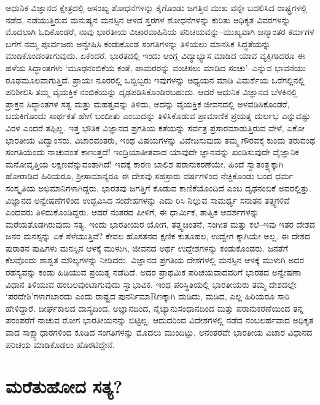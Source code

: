 ಆಧುನಿಕ ವಿಜ್ಞಾನದ ಕ್ಷೇತ್ರದಲ್ಲಿ ಅಸಂಖ್ಯ ಶೋಧನೆಗಳನ್ನು ಕೈಗೊಂಡು ಜಗತ್ತಿನ ಮುಖ ವನ್ನೇ ಬದಲಿಸಿದ ರಾಷ್ಟ್ರಗಳಲ್ಲಿ ನಡೆದ, ನಡೆಯುತ್ತಿರುವ ಮನುಷ್ಯನ ಮನಸ್ಸಿನ ಆಳದ ಸ್ತರಗಳ ಶೋಧನೆಗಳನ್ನು ಕುರಿತು ಅಧಿಕೃತ ವಿವರಗಳನ್ನು ಮೊದಲಾಗಿ ಓದಿಕೊಂಡರೆ, ನಾವು ಭಾರತೀಯ ವಿಚಾರವಾಹಿನಿಯ ಪರಿಚಯವನ್ನು–ಮುಖ್ಯವಾಗಿ ಜನ್ಮಾಂತರ ಕರ್ಮಗಳ ಬಗೆಗೆ ನಮ್ಮ ಪೂರ್ವಜರು ಅನ್ವೇಷಿಸಿ ಕಂಡುಕೊಂಡ ಸಂಗತಿಗಳನ್ನು ತಿಳಿಯಲು ಮಾನಸಿಕ ಸಿದ್ಧತೆಯನ್ನು ಮಾಡಿಕೊಂಡಂತಾಗುವುದು. ಏಕೆಂದರೆ, ಭಾರತದಲ್ಲಿ ಇಂದು ಆಂಗ್ಲ ವಿದ್ಯಾಭ್ಯಾಸ ಮಾಡಿದ ಯಾವ ವ್ಯಕ್ತಿಗಾದರೂ ಈ ಹಳೆಯ ಸಿದ್ಧಾಂತಗಳು ‘ಮೂಢನಂಬಿಕೆಯ ಕಂತೆ, ಪಾಮರರನ್ನು ವಂಚಿಸಲು ಮಾಡಿದ ಸಂಚು’–ಎನ್ನುವ ಭಾವನೆಯು ರೂಢಮೂಲವಾಗುತ್ತಿದೆ. ಪ್ರಾಯಃ ನೂರರಲ್ಲಿ ಒಬ್ಬಿಬ್ಬರು ಇವುಗಳನ್ನು ಅಧ್ಯಯನ ಮಾಡಿ ವಿಮರ್ಶೆಯ ಒರೆಗಲ್ಲಿನಲ್ಲಿ ಪರಿಶೀಲಿಸಿ ತಮ್ಮ ವೈಯಕ್ತಿಕ ನಂಬಿಕೆಯನ್ನು ದೃಢಪಡಿಸಿಕೊಂಡಿರಬಹುದು. ಆದರೆ ಆಧುನಿಕ ವಿಜ್ಞಾನದ ಬೆಳಕಿನಲ್ಲಿ ಪ್ರಾಕ್ತನ ಸಿದ್ಧಾಂತಗಳ ಸತ್ವ ಮತ್ತು ಮಹತ್ವವನ್ನು ತಿಳಿದು, ಅದನ್ನು ವೈಯಕ್ತಿಕ ಜೀವನದಲ್ಲಿ ಅಳವಡಿಸಿಕೊಂಡರೆ, ಬದುಕಿಗೊಂದು ಸಾರ್ಥಕತೆ ಹೇಗೆ ಬಂದೀತು ಎಂಬುದನ್ನು ತಿಳಿಸಿಕೊಡುವ ಪ್ರಾಮಾಣಿಕ ಪ್ರಯತ್ನ ದುರ್ಲಭ ಎನ್ನುವಷ್ಟು ವಿರಳ ಎಂದರೆ ತಪ್ಪಿಲ್ಲ. ಇತ್ತ ಭೌತಿಕ ವಿಜ್ಞಾನದ ಪ್ರಗತಿಯ ಕತೆಯನ್ನು ಸರ್ವತ್ರ ಪ್ರಸಾರಮಾಡುತ್ತಿರುವ ವೇಳೆ, ಏಕೋ ಭಾರತೀಯ ವಿದ್ವಾಂಸರು, ವಿಚಾರವಂತರು, ಇಂಥ ವಿಷಯಗಳನ್ನು ವಿವೇಚಿಸುವುದು ತಮ್ಮ ಗೌರವಕ್ಕೆ ಕುಂದು ತರುವಂಥ ಸಂಗತಿಯೆಂದು ನಾಚುವಂತೆ ಕಾಣುತ್ತದೆ! ಇಂದ್ರಿಯಾತೀತವಾದ ಯಾವುದೇ ಜ್ಞಾನವನ್ನು ಖಂಡಿಸುವುದೇ ವೈಜ್ಞಾನಿಕ ಮನೋವೃತ್ತಿಯ ಲಕ್ಷಣವೆನ್ನುವಂತಾಗಿದೆ! ಇದಕ್ಕೆ ಕಾರಣ ಬಾಲಿಶ ಪರಾನುಕರಣೆಯೇ. ಹಿಂದೆ ಸ್ವಾತಂತ್ರ್ಯಕ್ಕಾಗಿ ಹೋರಾಡಿದ ಹಿರಿಯರೂ, ಶ‍್ರೀಸಾಮಾನ್ಯರೂ ಈ ದೇಶವು ಸಹಸ್ರಾರು ವರ್ಷಗಳಿಂದ ನೆಚ್ಚಿಕೊಂಡು ಬಂದ ಧರ್ಮ ಸಂಸ್ಕೃತಿಯ ಅಭಿಮಾನಿಗಳಾಗಿದ್ದರು. ಭಾರತವು ಜಗತ್ತಿಗೆ ಕೊಡುವ ಕಾಣಿಕೆಯೊಂದಿದೆ ಎಂಬ ದೃಢನಂಬಿಕೆ ಅವರಲ್ಲಿತ್ತು. ವಿಜ್ಞಾನದ ಅನ್ವೇಷಣೆಗಳಿಂದ ಉದ್ಭವಿಸಿದ ಸಂದೇಹಗಳನ್ನು ಎದು ರಿಸಿ ನಿಲ್ಲುವ ಸಾಮರ್ಥ್ಯ ಸನಾತನ ತತ್ತ್ವಗಳಿವೆ ಎಂದವರು ತಿಳಿದುಕೊಂಡಿದ್ದರು. ಆದರೆ ನಂತರದ ಪೀಳಿಗೆ, ಈ ಧಾರ್ಮಿಕ, ತಾತ್ವಿಕ ಆದರ್ಶಗಳನ್ನು ಮರೆಯತೊಡಗಿರುವುದು ಸತ್ಯ. ಇಂದು ಭಾರತೀಯರ ಯೋಗ, ತತ್ತ್ವಚಿಂತನೆ, ಸಂಗೀತ ಮತ್ತು ಕಲೆ–ಇವು ಇತರ ದೇಶದ ಜನರ ಮನಸ್ಸನ್ನು ಏಕೆ ಸೆಳೆಯುತ್ತಿವೆ? ಕೇವಲ ಹೊಸತನದ ಕ್ಷಣಿಕ ಕುತೂಹಲ, ಉದ್ವೇಗ ಕ್ಕಾಗಿಯೇ ಅಲ್ಲ. ಈ ದೇಶದ ಪುರಾತನ ಪುಷಿಗಳು ಮನಸ್ಸಿನ ಆಳಕ್ಕೆ ಮುಳುಗಿ, ಜೀವನದ ಅರ್ಥ ಉದ್ದೇಶಗಳನ್ನು ಕಂಡುಕೊಂಡರು. ಜನತೆಗೆ ಕೆಲವೊಂದು ಶಾಶ್ವತ ಮೌಲ್ಯಗಳನ್ನು ನೀಡಿದರು. ವಿಜ್ಞಾನದ ಪ್ರಗತಿಯ ದೇಶಗಳಲ್ಲಿ ಮನಸ್ಸಿನ ಆಳಕ್ಕೆ ಮುಳುಗಿ ಅದರ ರಹಸ್ಯವನ್ನು ಕಂಡು ಹಿಡಿಯುವ ಪ್ರಯತ್ನ ನಡೆದಿದೆ. ಅದರ ಪ್ರಾಥಮಿಕ ಪರಿಚಯವಾದವರಿಗೆ ಭಾರತದ ಅನ್ವೇಷಣಾ ವಿಧಾನ ತಿಳಿಯುವ ಹಂಬಲವುಂಟಾಗುವುದು ಸ್ವಾಭಾವಿಕ. ಇಂಥ ಪರಿಸ್ಥಿತಿಯಲ್ಲಿ ಭಾರತೀಯರು ತಮ್ಮ ದೇಶದಲ್ಲೇ ‘ಪರದೇಶಿ’ಗಳಾಗಬಾರದು ಎಂದು ರಾಷ್ಟ್ರದ ಪುನರ್ನಿಮಾRಣಕ್ಕಾಗಿ ದುಡಿದು, ಮಡಿದ, ಎಲ್ಲ ಹಿರಿಯರೂ ಸಾರಿ ಹೇಳಿದ್ದಾರೆ. ದೀರ್ಘಕಾಲದ ದಾಸ್ಯದಿಂದ, ಅಜ್ಞಾನದಿಂದ, ನೈಚ್ಯಾನುಸಂಧಾನದಿಂದ ಮತ್ತು ಪರಾನುಕರಣೆಯಿಂದ ತನ್ನ ಪರಂಪರೆಗೆ ನಾಚುವ ರೋಗ ಭಾರತೀಯನನ್ನು ಬಿಟ್ಟಿಲ್ಲ. ಆದುದರಿಂದ ವಿದೇಶಗಳಲ್ಲಿ ನಡೆದ ನಂಬಲರ್ಹವಾದ ಅಧಿಕೃತ ವಾದ ಸಾಕ್ಷ್ಯಾಧಾರಗಳಿಂದ ಕೂಡಿದ ಸಂಗತಿಗಳನ್ನು ಮೊದಲು ಮುಂದಿಟ್ಟು, ಅನಂತರವೇ ಭಾರತೀಯ ವಿಚಾರ ವಿಧಾನದ ಪರಿಚಯ ಮಾಡಿಕೊಡಲು ಹೊರಟಿದ್ದೇನೆ.


\section{ಮರೆತುಹೋದ ಸತ್ಯ?}

